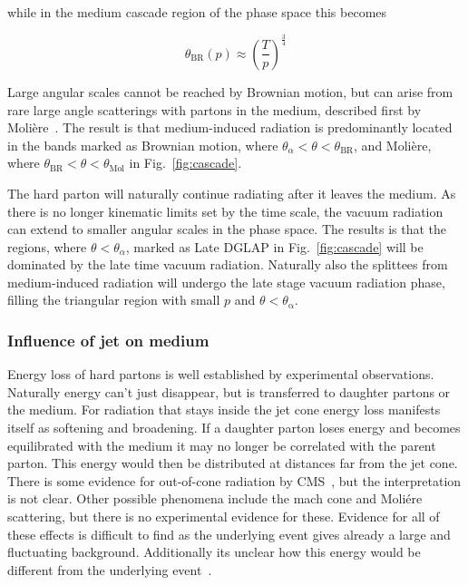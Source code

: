 \noindent while in the medium cascade region of the phase space this becomes

\begin{equation}
\theta_\mathrm{BR}\left(p\right) \approx \left(\frac{T}{p}\right)^{\frac{3}{4}}
\end{equation}

\noindent Large angular scales cannot be reached by Brownian motion, but can arise from rare large angle scatterings with partons in the medium, described first by Molière~\cite{missing}. The result is that medium-induced radiation is predominantly located in the bands marked as Brownian motion, where $\theta_\alpha < \theta < \theta_\mathrm{BR}$, and Moli\`ere, where $\theta_\mathrm{BR} < \theta < \theta_\mathrm{Mol}$ in Fig.~\ref{fig:cascade}. 

The hard parton will naturally continue radiating after it leaves the medium. As there is no longer kinematic limits set by the time scale, the vacuum radiation can extend to smaller angular scales in the phase space. The results is that the regions, where $\theta<\theta_\alpha$, marked as Late DGLAP in Fig.~\ref{fig:cascade} will be dominated by the late time vacuum radiation. Naturally also the splittees from medium-induced radiation will undergo the late stage vacuum radiation phase, filling the triangular region with small $p$ and $\theta < \theta_\mathrm{\alpha}$.



\subsubsection*{Influence of jet on medium}
Energy loss of hard partons is well established by experimental observations. Naturally energy can't just disappear, but is transferred to daughter partons or the medium. For radiation that stays inside the jet cone energy loss manifests itself as softening and broadening. If a daughter parton loses energy and becomes equilibrated with the medium it may no longer be correlated with the parent parton. This energy would then be distributed at distances far from the jet cone. There is some evidence for out-of-cone radiation by CMS~\cite{Chatrchyan:2011sx}, but the interpretation is not clear. Other possible phenomena include the mach cone and Moliére scattering, but there is no experimental evidence for these. Evidence for all of these effects is difficult to find as the underlying event gives already a large and fluctuating background. Additionally its unclear how this energy would be different from the underlying event~\cite{Connors:2017ptx}.

